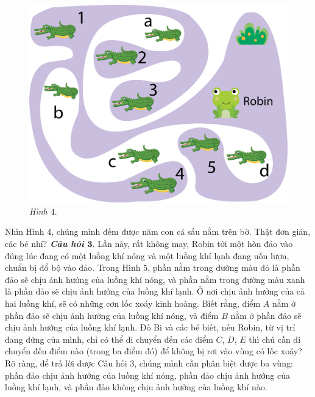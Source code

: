 \begin{multicols}{2}
\begin{figure}[H]
		\includegraphics[width=1\linewidth]{pic13}
		\caption{\small\textit{Hình $4.$}}
		\vspace*{-10pt}
	\end{figure}
	Nhìn Hình $4$, chúng mình đếm được năm con cá sấu nằm trên bờ. Thật đơn giản, các bé nhỉ?
	\vskip 0.1cm
	\textbf{\color{toancuabi}\textit{Câu hỏi $\pmb{3.}$}} Lần này, rất không may, Robin tới một hòn đảo vào đúng lúc đang có một luồng khí nóng và một luồng khí lạnh đang uốn lượn, chuẩn bị đổ bộ vào đảo. Trong  Hình $5$, phần nằm trong đường màu đỏ là phần đảo sẽ chịu ảnh hưởng của luồng khí nóng, và phần nằm trong đường màu xanh là phần đảo sẽ chịu ảnh hưởng của luồng khí lạnh. Ở nơi chịu ảnh hưởng của cả hai luồng khí, sẽ có những cơn lốc xoáy kinh hoàng. Biết rằng, điểm $A$ nằm ở phần đảo sẽ chịu ảnh hưởng của luồng khí nóng, và điểm  $B$ nằm ở phần đảo sẽ chịu ảnh hưởng của luồng khí lạnh. Đố Bi và các bé biết, nếu Robin, từ vị trí đang đứng của mình, chỉ có thể di chuyển đến các điểm $C$, $D$, $E$ thì chú cần di chuyển đến điểm nào (trong ba điểm đó) để không bị rơi vào vùng có  lốc xoáy?
	\vskip 0.01cm
	Rõ ràng, để trả lời được Câu hỏi $3$, chúng mình cần phân biệt được ba vùng: phần đảo chịu ảnh hưởng của luồng khí nóng, phần đảo chịu ảnh hưởng của luồng khí lạnh, và phần đảo không chịu ảnh hưởng của luồng khí nào.
	\begin{figure}[H]
		\vspace*{-5pt}
		\centering
		\captionsetup{labelformat=empty, justification=centering}

\end{figure}
\end{multicols}
